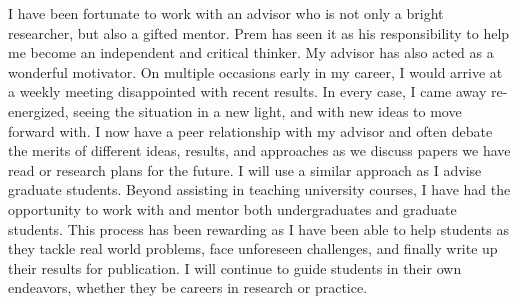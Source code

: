 \documentclass[10pt]{article}
\begin{document}
I have been fortunate to work with an advisor who is not only a bright
researcher, but also a gifted mentor.  Prem has seen it as his responsibility
to help me become an independent and critical thinker.  My advisor has also
acted as a wonderful motivator.  On multiple occasions early in my career, I
would arrive at a weekly meeting disappointed with recent results.  In every case, I came
away re-energized, seeing the situation in a new light, and with new ideas to
move forward with.  I now have a peer relationship with my advisor and often
debate the merits of different ideas, results, and approaches as we discuss
papers we have read or research plans for the future.  I will use a similar
approach as I advise graduate students. Beyond assisting in teaching university
courses, I have had the opportunity to work with and mentor both undergraduates
and graduate students.  This process has been rewarding as I have been
able to help students as they tackle real world problems, face unforeseen
challenges, and finally write up their results for publication.  I will
continue to guide students in their own endeavors, whether they be careers in
research or practice.
\end{document}
